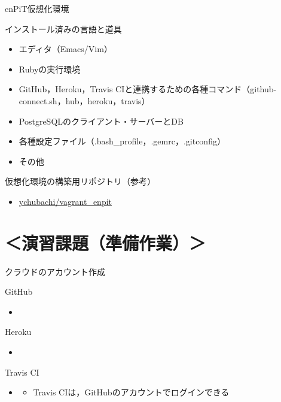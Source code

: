 \documentclass[t, aspectratio=169]{beamer}
\begin{document}
\begin{frame}[label=sec-1-4-5]{enPiT仮想化環境}
\begin{block}{インストール済みの言語と道具}
\begin{itemize}
\item エディタ（Emacs/Vim）
\item Rubyの実行環境
\item GitHub，Heroku，Travis CIと連携するための各種コマンド（github-connect.sh，hub，heroku，travis）
\item PostgreSQLのクライアント・サーバーとDB
\item 各種設定ファイル（.bash\_profile，.gemrc，.gitconfig）
\item その他
\end{itemize}
\end{block}

\begin{block}{仮想化環境の構築用リポジトリ（参考）}
\begin{itemize}
\item \href{https://github.com/ychubachi/vagrant_enpit}{ychubachi/vagrant\_enpit}
\end{itemize}
\end{block}
\end{frame}

\section{＜演習課題（準備作業）＞}
\label{sec-1-5}
\begin{frame}[label=sec-1-5-1]{クラウドのアカウント作成}
\begin{block}{GitHub}
\begin{itemize}
\item{}
\end{itemize}
\end{block}

\begin{block}{Heroku}
\begin{itemize}
\item{}
\end{itemize}
\end{block}

\begin{block}{Travis CI}
\begin{itemize}
\item{}
\begin{itemize}
\item Travis CIは，GitHubのアカウントでログインできる
\end{itemize}
\end{itemize}
\end{block}
\end{frame}
\end{document}
